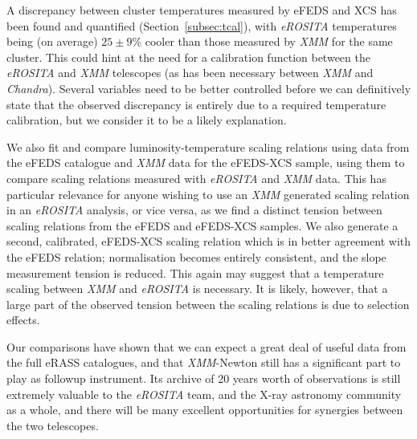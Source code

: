 \documentclass[fleqn,usenatbib]{mnras}
\begin{document}
A discrepancy between cluster temperatures measured by eFEDS and XCS has been found and quantified (Section~\ref{subsec:tcal}), with {\em eROSITA} temperatures being (on average) $25{\pm}9$\% cooler than those measured by {\em XMM} for the same cluster. This could hint at the need for a calibration function between the {\em eROSITA} and {\em XMM} telescopes (as has been necessary between {\em XMM} and {\em Chandra}). Several variables need to be better controlled before we can definitively state that the observed discrepancy is entirely due to a required temperature calibration, but we consider it to be a likely explanation. 

We also fit and compare luminosity-temperature scaling relations using data from the eFEDS catalogue and {\em XMM} data for the eFEDS-XCS sample, using them to compare scaling relations measured with {\em eROSITA} and {\em XMM} data. This has particular relevance for anyone wishing to use an {\em XMM} generated scaling relation in an {\em eROSITA} analysis, or vice versa, as we find a distinct tension between scaling relations from the eFEDS and eFEDS-XCS samples. We also generate a second, calibrated, eFEDS-XCS scaling relation which is in better agreement with the eFEDS relation; normalisation becomes entirely consistent, and the slope measurement tension is reduced. This again may suggest that a temperature scaling between {\em XMM} and {\em eROSITA} is necessary. It is likely, however, that a large part of the observed tension between the scaling relations is due to selection effects.

Our comparisons have shown that we can expect a great deal of useful data from the full eRASS catalogues, and that {\em XMM}-Newton still has a significant part to play as followup instrument. Its archive of 20 years worth of observations is still extremely valuable to the {\em eROSITA} team, and the X-ray astronomy community as a whole, and there will be many excellent opportunities for synergies between the two telescopes.
\end{document}
